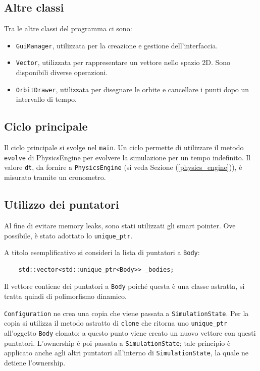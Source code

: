 \documentclass{article}
\begin{document}
\subsection{Altre classi}
Tra le altre classi del programma ci sono:
\begin{itemize}
    \item \verb|GuiManager|, utilizzata per la creazione e gestione dell'interfaccia.
    \item \verb|Vector|, utilizzata per rappresentare un vettore nello spazio 2D. Sono disponibili diverse operazioni.
    \item \verb|OrbitDrawer|, utilizzata per disegnare le orbite e cancellare i punti dopo un intervallo di tempo.
\end{itemize}

\subsection{Ciclo principale}
Il ciclo principale si svolge nel \verb|main|. Un ciclo permette di utilizzare il metodo \verb|evolve| di PhysicsEngine per evolvere la simulazione per un tempo indefinito. Il valore \verb|dt|, da fornire a \verb|PhysicsEngine| (si veda Sezione (\ref{physics_engine})), è misurato tramite un cronometro.

\subsection{Utilizzo dei puntatori}
Al fine di evitare memory leaks, sono stati utilizzati gli smart pointer. Ove possibile, è stato adottato lo \verb|unique_ptr|.

A titolo esemplificativo si consideri la lista di puntatori a \verb|Body|:
\begin{verbatim}
    std::vector<std::unique_ptr<Body>> _bodies;
\end{verbatim}

Il vettore contiene dei puntatori a \verb|Body| poiché questa è una classe astratta, si tratta quindi di polimorfismo dinamico.

\verb|Configuration| ne crea una copia che viene passata a \verb|SimulationState|. Per la copia si utilizza il metodo astratto di \verb|clone| che ritorna uno \verb|unique_ptr| all'oggetto \verb|Body| clonato: a questo punto viene creato un nuovo vettore con questi puntatori. L'ownership è poi passata a \verb|SimulationState|; tale principio è applicato anche agli altri puntatori all'interno di \verb|SimulationState|, la quale ne detiene l'ownership.
\end{document}
